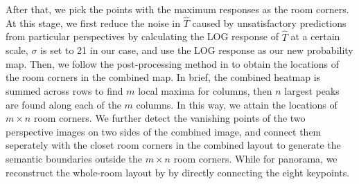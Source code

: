 %
After that, we pick the points with the maximum responses as the room corners. 
At this stage, we first reduce the noise in $\hat{T}$ caused by unsatisfactory predictions from particular perspectives by calculating the LOG response of $\hat{T}$ at a certain scale, $\sigma$ is set to 21 in our case, and use the LOG response as our new probability map.
%
Then, we follow the post-processing method in \cite{zou2018layoutnet} to obtain the locations of the room corners in the combined map. In brief, the combined heatmap is summed across rows to find $m$ local maxima for columns, then $n$ largest peaks are found along each of the $m$ columns. In this way, we attain the locations of $m \times n$ room corners. We further detect the vanishing points of the two perspective images on two sides of the combined image, and connect them seperately with the closet room corners in the combined layout to generate the semantic boundaries outside the $m \times n$ room corners. While for panorama, we reconstruct the whole-room layout by by directly connecting the eight keypoints.
%


